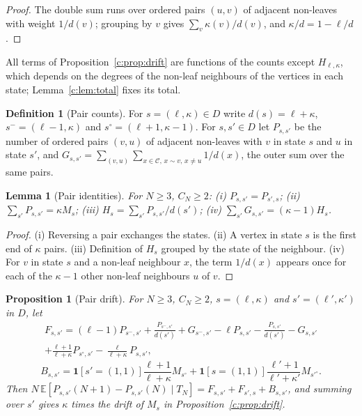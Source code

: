 \documentclass[11pt]{article}
\theoremstyle{plain}
\newtheorem{lemma}[theorem]{Lemma}
\newtheorem{proposition}[theorem]{Proposition}
\theoremstyle{definition}
\newtheorem{definition}[theorem]{Definition}
\theoremstyle{remark}
\begin{document}
\begin{proof}
The double sum runs over ordered pairs $(u,v)$ of adjacent non-leaves with weight $1/d(v)$; grouping by $v$ gives $\sum_v\kappa(v)/d(v)$, and $\kappa/d=1-\ell/d$.
\end{proof}

All terms of Proposition~\ref{c:prop:drift} are functions of the counts except $H_{\ell,\kappa}$, which depends on the degrees of the non-leaf neighbours of the vertices in each state; Lemma~\ref{c:lem:total} fixes its total.

\begin{definition}[Pair counts]
For $s=(\ell,\kappa)\in D$ write $d(s)=\ell+\kappa$, $s^{-}=(\ell-1,\kappa)$ and $s^{\circ}=(\ell+1,\kappa-1)$. For $s,s'\in D$ let $P_{s,s'}$ be the number of ordered pairs $(v,u)$ of adjacent non-leaves with $v$ in state $s$ and $u$ in state $s'$, and $G_{s,s'}=\sum_{(v,u)}\sum_{x\in\mathcal{C},\,x\sim v,\,x\neq u}1/d(x)$, the outer sum over the same pairs.
\end{definition}

\begin{lemma}[Pair identities]\label{c:lem:pairid}
For $N\ge3$, $C_N\ge2$: (i) $P_{s,s'}=P_{s',s}$; (ii) $\sum_{s'}P_{s,s'}=\kappa M_s$; (iii) $H_s=\sum_{s'}P_{s,s'}/d(s')$; (iv) $\sum_{s'}G_{s,s'}=(\kappa-1)H_s$.
\end{lemma}

\begin{proof}
(i) Reversing a pair exchanges the states. (ii) A vertex in state $s$ is the first end of $\kappa$ pairs. (iii) Definition of $H_s$ grouped by the state of the neighbour. (iv) For $v$ in state $s$ and a non-leaf neighbour $x$, the term $1/d(x)$ appears once for each of the $\kappa-1$ other non-leaf neighbours $u$ of $v$.
\end{proof}

\begin{proposition}[Pair drift]\label{c:prop:pairdrift}
For $N\ge3$, $C_N\ge2$, $s=(\ell,\kappa)$ and $s'=(\ell',\kappa')$ in $D$, let
\begin{multline*}
F_{s,s'}=(\ell-1)P_{s^{-},s'}+\frac{P_{s^{-},s'}}{d(s')}+G_{s^{-},s'}-\ell P_{s,s'}-\frac{P_{s,s'}}{d(s')}-G_{s,s'}\\
+\frac{\ell+1}{\ell+\kappa}P_{s^{\circ},s'}-\frac{\ell}{\ell+\kappa}P_{s,s'},
\end{multline*}
\[
B_{s,s'}=\mathbf{1}[s'=(1,1)]\frac{\ell+1}{\ell+\kappa}M_{s^{\circ}}+\mathbf{1}[s=(1,1)]\frac{\ell'+1}{\ell'+\kappa'}M_{s'^{\circ}}.
\]
Then $N\,\mathbb{E}[P_{s,s'}(N+1)-P_{s,s'}(N)\mid T_N]=F_{s,s'}+F_{s',s}+B_{s,s'}$, and summing over $s'$ gives $\kappa$ times the drift of $M_s$ in Proposition~\ref{c:prop:drift}.
\end{proposition}
\end{document}
